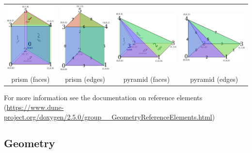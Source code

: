 \documentclass[ignorenonframetext,11pt]{beamer}
\theoremstyle{definition}
\begin{document}
\begin{frame}
\begin{onlyenv}
\begin{center}
\begin{tabular}{cccc}
      \end{tabular}
    \end{center}
    \begin{center}
      \begin{tabular}{cccc}
        \includegraphics[height=0.23\linewidth]{gg_prism} &
        \includegraphics[height=0.23\linewidth]{gg_prism_edges} &
        \includegraphics[height=0.23\linewidth]{gg_pyramid} &
        \includegraphics[height=0.23\linewidth]{gg_pyramid_edges}
        \\
        prism (faces) & prism (edges) & pyramid (faces) & pyramid (edges)\\
      \end{tabular}
    \end{center}
    For more information see the documentation on reference elements
    (\url{https://www.dune-project.org/doxygen/2.5.0/group__GeometryReferenceElements.html})
  \end{onlyenv}
\end{frame}



\subsection{Geometry}
\end{document}
